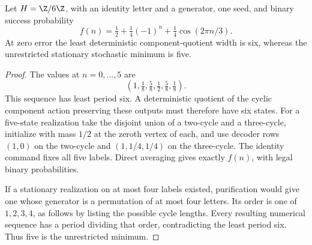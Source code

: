\begin{proposition}\label{prop:C655}
Let $H=\Z/6\Z$, with an identity letter and a generator, one seed, and binary success probability
\[
 f(n)=\tfrac12+\tfrac14(-1)^n+\tfrac14\cos(2\pi n/3).
\]
At zero error the least deterministic component-quotient width is six, whereas the unrestricted stationary stochastic minimum is five.
\end{proposition}
\begin{proof}
The values at $n=0,\ldots,5$ are
\[
                  (1,\tfrac18,\tfrac58,\tfrac12,\tfrac58,\tfrac18).
\]
This sequence has least period six. A deterministic quotient of the cyclic component action preserving these outputs must therefore have six states. For a five-state realization take the disjoint union of a two-cycle and a three-cycle, initialize with mass $1/2$ at the zeroth vertex of each, and use decoder rows $(1,0)$ on the two-cycle and $(1,1/4,1/4)$ on the three-cycle. The identity command fixes all five labels. Direct averaging gives exactly $f(n)$, with legal binary probabilities.

If a stationary realization on at most four labels existed, purification would give one whose generator is a permutation of at most four letters. Its order is one of $1,2,3,4$, as follows by listing the possible cycle lengths. Every resulting numerical sequence has a period dividing that order, contradicting the least period six. Thus five is the unrestricted minimum.
\end{proof}
